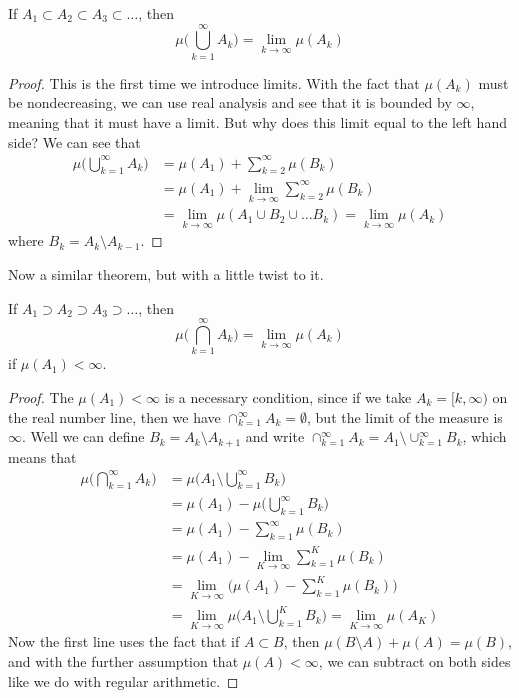   \begin{theorem}
    If $A_1 \subset A_2 \subset A_3 \subset \ldots$, then 
    \begin{equation}
      \mu\bigg( \bigcup_{k=1}^\infty A_k \bigg) = \lim_{k \rightarrow \infty} \mu(A_k)
    \end{equation}
  \end{theorem}
  \begin{proof}
    This is the first time we introduce limits. With the fact that $\mu(A_k)$ must be nondecreasing, we can use real analysis and see that it is bounded by $\infty$, meaning that it must have a limit. But why does this limit equal to the left hand side? We can see that 
    \begin{align}
      \mu\bigg( \bigcup_{k=1}^\infty A_k \bigg) & = \mu(A_1) + \sum_{k=2}^\infty \mu(B_k) \\
      & = \mu(A_1) + \lim_{k \rightarrow \infty} \sum_{k=2}^\infty \mu(B_k) \\
      & = \lim_{k \rightarrow \infty} \mu(A_1 \cup B_2 \cup \ldots B_k)  = \lim_{k \rightarrow \infty} \mu(A_k) 
    \end{align}
    where $B_k = A_k \setminus A_{k-1}$. 
  \end{proof}

  Now a similar theorem, but with a little twist to it. 

  \begin{theorem}
    If $A_1 \supset A_2 \supset A_3 \supset \ldots$, then 
    \begin{equation}
      \mu\bigg( \bigcap_{k=1}^\infty A_k \bigg) = \lim_{k \rightarrow \infty} \mu(A_k)
    \end{equation}
    if $\mu(A_1) < \infty$. 
  \end{theorem}
  \begin{proof}
    The $\mu(A_1) < \infty$ is a necessary condition, since if we take $A_k = [k, \infty)$ on the real number line, then we have $\cap_{k=1}^\infty A_k = \emptyset$, but the limit of the measure is $\infty$. Well we can define $B_k = A_k \setminus A_{k+1}$ and write $\cap_{k=1}^\infty A_k = A_1 \setminus \cup_{k=1}^\infty B_k$, which means that 
    \begin{align*}
      \mu\bigg( \bigcap_{k=1}^\infty A_k \bigg) & = \mu\bigg( A_1 \setminus \bigcup_{k=1}^\infty B_k \bigg) \\
      & = \mu(A_1) - \mu\bigg( \bigcup_{k=1}^\infty B_k\bigg) \\
      & = \mu(A_1) - \sum_{k=1}^\infty \mu(B_k) \\
      & = \mu(A_1) - \lim_{K \rightarrow \infty} \sum_{k=1}^K \mu(B_k) \\
      & = \lim_{K \rightarrow \infty} \bigg( \mu(A_1) - \sum_{k=1}^K \mu(B_k) \bigg) \\
      & = \lim_{K \rightarrow \infty} \mu \bigg( A_1 \setminus \bigcup_{k=1}^K B_k \bigg) = \lim_{K \rightarrow \infty} \mu(A_K)
    \end{align*}
    Now the first line uses the fact that if $A \subset B$, then $\mu(B \setminus A) + \mu(A) = \mu(B)$, and with the further assumption that $\mu(A) < \infty$, we can subtract on both sides like we do with regular arithmetic. 
  \end{proof}
